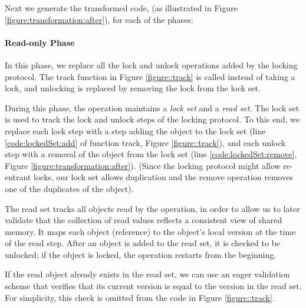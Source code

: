 Next we generate the transformed code, (as illustrated in Figure \ref{figure:transformation:after}), 
for each of the phases:

\paragraph{Read-only Phase} 

In this phase, we replace all the lock and unlock operations added by the locking protocol.
The track function in Figure \ref{figure::track} is called instead of taking a lock, and unlocking 
is replaced by removing the lock from the lock set.

During this phase, the operation maintains a \emph{lock set} and a \emph{read set}. 
The lock set is used to track the lock and unlock steps of the locking protocol. To this end, we replace each lock step 
  with a step adding the object to the lock set 
  (line \ref{code:lockedSet:add} of function track, Figure \ref{figure::track}), 
  and each unlock step with a removal of the object 
  from the lock set (line \ref{code:lockedSet:remove}, Figure
  \ref{figure:transformation:after}).
  (Since the locking protocol might allow re-entrant locks, 
  our lock set allows duplication and the remove 
  operation removes one of the duplicates of the object).
  
The read set  tracks all objects read by the 
operation, in order to allow us to later validate that the collection of read
values reflects a consistent view of shared memory.  It maps each object (reference)  
to the object's local version at the time of the read step. After an object is
added to the read set, it is checked to be unlocked; if the object is locked, the operation restarts from the beginning.



 
If the read object already exists in the read set, we can use an eager
validation scheme that verifies that its current version is equal to the
version in the read set. 
For simplicity, this check is omitted from the code in Figure \ref{figure::track}.
 

